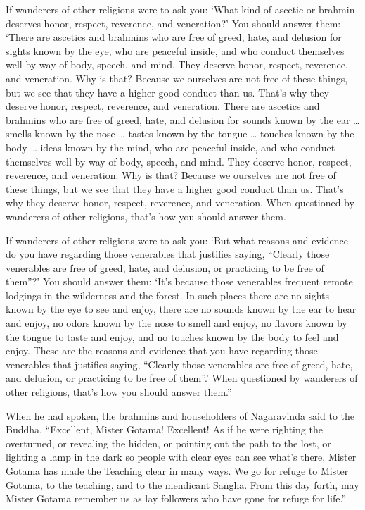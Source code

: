 \documentclass[12pt,openany]{book}%
\begin{document}
If wanderers of other religions were to ask you: ‘What kind of ascetic or brahmin deserves honor, respect, reverence, and veneration?’ You should answer them: ‘There are ascetics and brahmins who are free of greed, hate, and delusion for sights known by the eye, who are peaceful inside, and who conduct themselves well by way of body, speech, and mind. They deserve honor, respect, reverence, and veneration. Why is that? Because we ourselves are not free of these things, but we see that they have a higher good conduct than us. That’s why they deserve honor, respect, reverence, and veneration. There are ascetics and brahmins who are free of greed, hate, and delusion for sounds known by the ear … smells known by the nose … tastes known by the tongue … touches known by the body … ideas known by the mind, who are peaceful inside, and who conduct themselves well by way of body, speech, and mind. They deserve honor, respect, reverence, and veneration. Why is that? Because we ourselves are not free of these things, but we see that they have a higher good conduct than us. That’s why they deserve honor, respect, reverence, and veneration. When questioned by wanderers of other religions, that’s how you should answer them. 

If wanderers of other religions were to ask you: ‘But what reasons and evidence do you have regarding those venerables that justifies saying, “Clearly those venerables are free of greed, hate, and delusion, or practicing to be free of them”?’ You should answer them: ‘It’s because those venerables frequent remote lodgings in the wilderness and the forest. In such places there are no sights known by the eye to see and enjoy, there are no sounds known by the ear to hear and enjoy, no odors known by the nose to smell and enjoy, no flavors known by the tongue to taste and enjoy, and no touches known by the body to feel and enjoy. These are the reasons and evidence that you have regarding those venerables that justifies saying, “Clearly those venerables are free of greed, hate, and delusion, or practicing to be free of them”.’ When questioned by wanderers of other religions, that’s how you should answer them.” 

When he had spoken, the brahmins and householders of Nagaravinda said to the Buddha, “Excellent, Mister Gotama! Excellent! As if he were righting the overturned, or revealing the hidden, or pointing out the path to the lost, or lighting a lamp in the dark so people with clear eyes can see what’s there, Mister Gotama has made the Teaching clear in many ways. We go for refuge to Mister Gotama, to the teaching, and to the mendicant \textsanskrit{Saṅgha}. From this day forth, may Mister Gotama remember us as lay followers who have gone for refuge for life.” 
\end{document}
